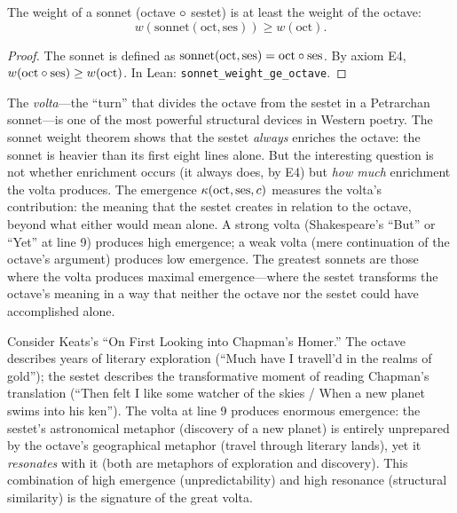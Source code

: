 \begin{theorem}
\label{thm:sonnet-weight}
The weight of a sonnet (octave $\circ$ sestet) is at least the weight of the octave:
\[
  w(\text{sonnet}(\text{oct}, \text{ses})) \geq w(\text{oct}).
\]
\end{theorem}

\begin{proof}
The sonnet is defined as $\text{sonnet}(\text{oct}, \text{ses}) = \text{oct} \circ \text{ses}$.  By axiom E4, $w(\text{oct} \circ \text{ses}) \geq w(\text{oct})$.  In Lean: \texttt{sonnet\_weight\_ge\_octave}.
\end{proof}

\begin{interpretation}
\label{interp:volta-emergence}
The \emph{volta}---the ``turn'' that divides the octave from the sestet in a Petrarchan sonnet---is one of the most powerful structural devices in Western poetry.  The sonnet weight theorem shows that the sestet \emph{always} enriches the octave: the sonnet is heavier than its first eight lines alone.  But the interesting question is not whether enrichment occurs (it always does, by E4) but \emph{how much} enrichment the volta produces.  The emergence $\kappa(\text{oct}, \text{ses}, c)$ measures the volta's contribution: the meaning that the sestet creates in relation to the octave, beyond what either would mean alone.  A strong volta (Shakespeare's ``But'' or ``Yet'' at line 9) produces high emergence; a weak volta (mere continuation of the octave's argument) produces low emergence.  The greatest sonnets are those where the volta produces maximal emergence---where the sestet transforms the octave's meaning in a way that neither the octave nor the sestet could have accomplished alone.

Consider Keats's ``On First Looking into Chapman's Homer.''  The octave describes years of literary exploration (``Much have I travell'd in the realms of gold''); the sestet describes the transformative moment of reading Chapman's translation (``Then felt I like some watcher of the skies / When a new planet swims into his ken'').  The volta at line 9 produces enormous emergence: the sestet's astronomical metaphor (discovery of a new planet) is entirely unprepared by the octave's geographical metaphor (travel through literary lands), yet it \emph{resonates} with it (both are metaphors of exploration and discovery).  This combination of high emergence (unpredictability) and high resonance (structural similarity) is the signature of the great volta.
\end{interpretation}

